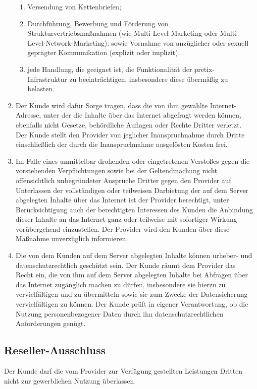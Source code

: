 \documentclass{terms}
\begin{document}
\begin{enumerate}
\begin{enumerate}
\item Versendung von Kettenbriefen;
\item Durchführung, Bewerbung und Förderung von Strukturvertriebsmaßnahmen (wie Multi-Level-Marketing oder Multi-Level-Network-Marketing); sowie Vornahme von anzüglicher oder sexuell geprägter Kommunikation (explizit oder implizit).
\item jede Handlung, die geeignet ist, die Funktionalität der pretix-Infrastruktur zu beeinträchtigen, insbesondere diese übermäßig zu belasten.
\end{enumerate}

\item Der Kunde wird dafür Sorge tragen, dass die von ihm gewählte Internet-Adresse, unter der die Inhalte über das Internet abgefragt werden können, ebenfalls nicht Gesetze, behördliche Auflagen oder Rechte Dritter verletzt. Der Kunde stellt den Provider von jeglicher Inanspruchnahme durch Dritte einschließlich der durch die Inanspruchnahme ausgelösten Kosten frei.
\item Im Falle eines unmittelbar drohenden oder eingetretenen Verstoßes gegen die vorstehenden Verpflichtungen sowie bei der Geltendmachung nicht offensichtlich unbegründeter Ansprüche Dritter gegen den Provider auf Unterlassen der vollständigen oder teilweisen Darbietung der auf dem Server abgelegten Inhalte über das Internet ist der Provider berechtigt, unter Berücksichtigung auch der berechtigten Interessen des Kunden die Anbindung dieser Inhalte an das Internet ganz oder teilweise mit sofortiger Wirkung vorübergehend einzustellen. Der Provider wird den Kunden über diese Maßnahme unverzüglich informieren.
\item Die von dem Kunden auf dem Server abgelegten Inhalte können urheber- und datenschutzrechtlich geschützt sein. Der Kunde räumt dem Provider das Recht ein, die von ihm auf dem Server abgelegten Inhalte bei Abfragen über das Internet zugänglich machen zu dürfen, insbesondere sie hierzu zu vervielfältigen und zu übermitteln sowie sie zum Zwecke der Datensicherung vervielfältigen zu können. Der Kunde prüft in eigener Verantwortung, ob die Nutzung personenbezogener Daten durch ihn datenschutzrechtlichen Anforderungen genügt.
\end{enumerate}


\subsection{Reseller-Ausschluss}

Der Kunde darf die vom Provider zur Verfügung gestellten Leistungen Dritten nicht zur gewerblichen Nutzung überlassen.
\end{document}
